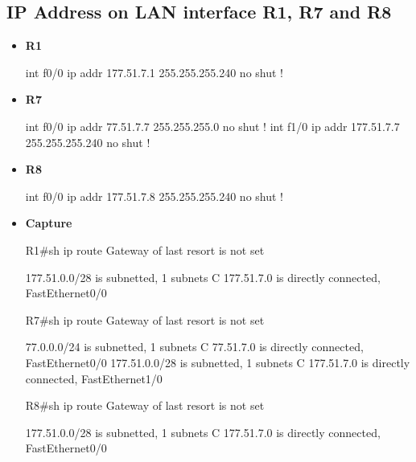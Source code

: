 \documentclass[10pt]{article}
\begin{document}
\subsection{IP Address on LAN interface R1, R7 and R8}
\begin{itemize}
\item {\bf R1}
\begin{verbatim*}
int f0/0
 ip addr 177.51.7.1 255.255.255.240
 no shut
!
\end{verbatim*}
\item {\bf R7}
\begin{verbatim*}
int f0/0
 ip addr 77.51.7.7 255.255.255.0
 no shut
!
int f1/0
 ip addr 177.51.7.7 255.255.255.240
 no shut
!
\end{verbatim*}
\item {\bf R8}
\begin{verbatim*}
int f0/0
 ip addr 177.51.7.8 255.255.255.240
 no shut
!
\end{verbatim*}
\item {\bf Capture}
\begin{verbatim*}
R1#sh ip route
Gateway of last resort is not set

177.51.0.0/28 is subnetted, 1 subnets
C       177.51.7.0 is directly connected, FastEthernet0/0

R7#sh ip route
Gateway of last resort is not set

77.0.0.0/24 is subnetted, 1 subnets
C       77.51.7.0 is directly connected, FastEthernet0/0
177.51.0.0/28 is subnetted, 1 subnets
C       177.51.7.0 is directly connected, FastEthernet1/0

R8#sh ip route
Gateway of last resort is not set

177.51.0.0/28 is subnetted, 1 subnets
C       177.51.7.0 is directly connected, FastEthernet0/0
\end{verbatim*}
\end{itemize}
\end{document}
